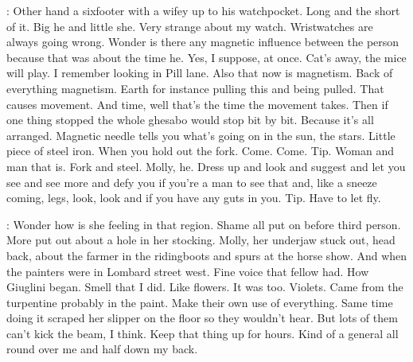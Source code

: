 \Bloom:
Other hand a sixfooter with a wifey up to his watchpocket. Long and
the short of it. Big he and little she. Very strange about my watch.
Wristwatches are always going wrong. Wonder is there any magnetic
influence between the person because that was about the time he. Yes, I
suppose, at once. Cat's away, the mice will play. I remember looking in
Pill lane. Also that now is magnetism. Back of everything magnetism. Earth
for instance pulling this and being pulled. That causes movement. And
time, well that's the time the movement takes. Then if one thing stopped
the whole ghesabo would stop bit by bit. Because it's all arranged.
Magnetic needle tells you what's going on in the sun, the stars. Little
piece of steel iron. When you hold out the fork. Come. Come. Tip. Woman
and man that is. Fork and steel. Molly, he. Dress up and look and suggest
and let you see and see more and defy you if you're a man to see that and,
like a sneeze coming, legs, look, look and if you have any guts in you.
Tip. Have to let fly.

\Bloom:
Wonder how is she feeling in that region. Shame all put on before
third person. More put out about a hole in her stocking. Molly, her
underjaw stuck out, head back, about the farmer in the ridingboots and
spurs at the horse show. And when the painters were in Lombard street
west. Fine voice that fellow had. How Giuglini began. Smell that I did.
Like flowers. It was too. Violets. Came from the turpentine probably in
the paint. Make their own use of everything. Same time doing it scraped
her slipper on the floor so they wouldn't hear. But lots of them can't
kick the beam, I think. Keep that thing up for hours. Kind of a general
all round over me and half down my back.

